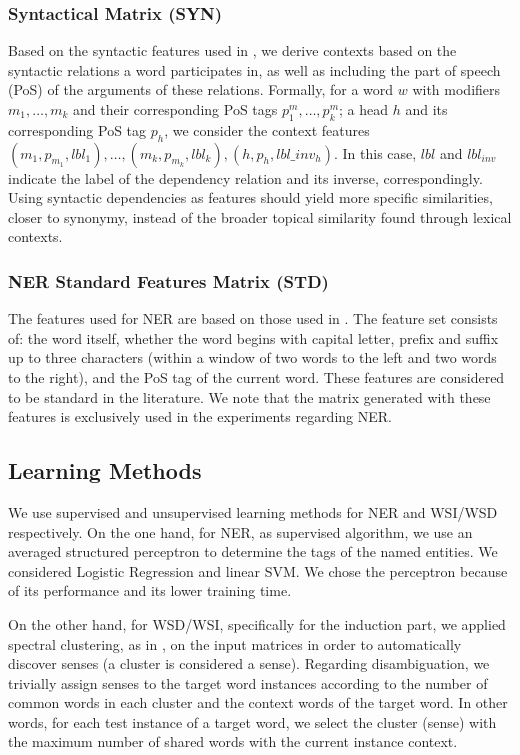 \documentclass{llncs}
\begin{document}
\subsubsection{Syntactical Matrix (SYN)}
Based on the syntactic features used in   \cite{LevyG14,Panchenko2017}, we derive contexts based on the syntactic relations a word participates in, as well as including the part of speech (PoS) of the arguments of these relations. Formally, for a word $w$ with modifiers $m_1, \dots, m_k$ and their corresponding PoS tags $p^m_1, \dots, p^m_k$; a head $h$ and its corresponding PoS tag $p_h$, we consider the context features $(m_1, p_{m_1}, lbl_1), \dots, \allowbreak (m_k, p_{m_k}, lbl_k), \allowbreak (h,p_h,lbl\_inv_h)$. In this case, $lbl$ and $lbl_{inv}$ indicate the label of the dependency relation and its inverse, correspondingly. Using syntactic dependencies as features should yield more specific similarities, closer to synonymy, instead of the broader topical similarity found through lexical contexts.
\subsubsection{NER Standard Features Matrix (STD)}
The features used for NER are based on those used in \cite{Daume2006,Balasuriya2009}. The feature set consists of: the word itself, whether the word begins with capital letter, prefix and suffix up to three characters (within a window of two words to the left and two words to the right), and the PoS tag of the current word. These features are considered to be standard in the literature. We note that the matrix generated with these features is exclusively used in the experiments regarding NER.	

\subsection{Learning Methods}
We use supervised and unsupervised learning methods for NER and WSI/WSD respectively. On the one hand, for NER, as supervised algorithm, we use an averaged structured perceptron \cite{Collins2002,Daume2006} to determine the tags of the named entities. We considered Logistic Regression and linear SVM. We chose the perceptron because of its performance and its lower training time.

On the other hand, for WSD/WSI, specifically for the induction part, we applied spectral clustering, as in  \cite{GoyalH14}, on the input matrices in order to automatically discover senses (a cluster is considered a sense). Regarding disambiguation, we trivially assign senses to the target word instances according to the number of common words in each cluster and the context words of the target word. In other words, for each test instance of a target word, we select the cluster (sense) with the maximum number of shared words with the current instance context.
\end{document}
